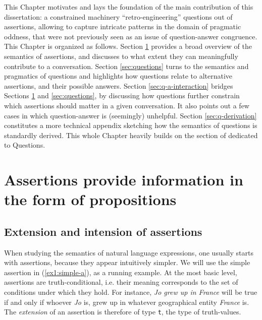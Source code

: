 This Chapter motivates and lays the foundation of the main contribution of this dissertation: a constrained machinery ``retro-engineering'' questions out of assertions, allowing to capture intricate patterns in the domain of pragmatic oddness, that were not previously seen as an issue of question-answer congruence. This Chapter is organized as follows. Section \ref{sec:assertions} provides a broad overview of the semantics of assertions, and discusses to what extent they can meaningfully contribute to a conversation. Section \ref{sec:questions} turns to the semantics and pragmatics of questions and highlights how questions relate to alternative assertions, and their possible answers. Section \ref{sec:q-a-interaction} bridges Sections \ref{sec:assertions} and \ref{sec:questions}, by discussing how questions further constrain which assertions should matter in a given conversation. It also points out a few cases in which question-answer is (seemingly) unhelpful. Section \ref{sec:q-derivation} constitutes a more technical appendix sketching how the semantics of questions is standardly derived. This whole Chapter heavily builds on the section of \textcite{Heim2023} dedicated to Questions.


\section{Assertions provide information in the form of propositions}\label{sec:assertions}

\subsection{Extension and intension of assertions}
When studying the semantics of natural language expressions, one usually starts with assertions, because they appear intuitively simpler. We will use the simple assertion in (\ref{ex1:simple-a}), as a running example. At the most basic level, assertions are truth-conditional, i.e. their meaning corresponds to the set of conditions under which they hold. For instance, \textit{Jo grew up in France} will be true if and only if whoever \textit{Jo} is, grew up in whatever geographical entity \textit{France} is. The \textit{extension} of an assertion is therefore of type \texttt{t}, the type of truth-values.

